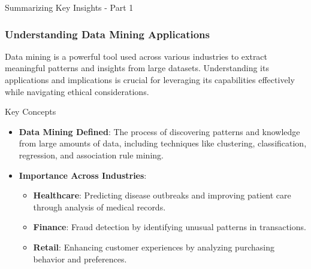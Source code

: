 \documentclass[aspectratio=169]{beamer}
\begin{document}
\begin{frame}[fragile]{Summarizing Key Insights - Part 1}
    \frametitle{Understanding Data Mining Applications}
    Data mining is a powerful tool used across various industries to extract meaningful patterns and insights from large datasets. Understanding its applications and implications is crucial for leveraging its capabilities effectively while navigating ethical considerations.

    \begin{block}{Key Concepts}
        \begin{itemize}
            \item \textbf{Data Mining Defined}: The process of discovering patterns and knowledge from large amounts of data, including techniques like clustering, classification, regression, and association rule mining.
            \item \textbf{Importance Across Industries}:
                \begin{itemize}
                    \item \textbf{Healthcare}: Predicting disease outbreaks and improving patient care through analysis of medical records.
                    \item \textbf{Finance}: Fraud detection by identifying unusual patterns in transactions.
                    \item \textbf{Retail}: Enhancing customer experiences by analyzing purchasing behavior and preferences.
                \end{itemize}
        \end{itemize}
    \end{block}
\end{frame}
\end{document}
